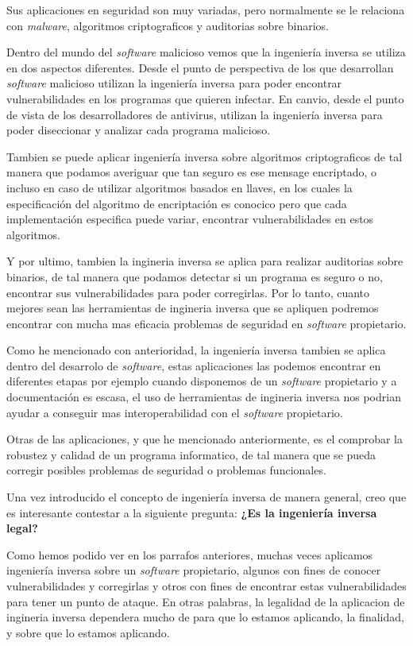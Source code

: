 Sus aplicaciones en seguridad son muy variadas, pero normalmente se le relaciona con \textit{malware}, algoritmos criptograficos y auditorias sobre binarios.

Dentro del mundo del \textit{software} malicioso vemos que la ingeniería inversa se utiliza en dos aspectos diferentes. Desde el punto de perspectiva de los que desarrollan
\textit{software} malicioso utilizan la ingeniería inversa para poder encontrar vulnerabilidades en los programas que quieren infectar. En canvio, desde el punto de vista de los 
desarrolladores de antivirus, utilizan la ingeniería inversa para poder diseccionar y analizar cada programa malicioso.

Tambien se puede aplicar ingeniería inversa sobre algoritmos criptograficos de tal manera que podamos averiguar que tan seguro es ese mensage encriptado, o incluso en caso de utilizar
algoritmos basados en llaves, en los cuales la especificación del algoritmo de encriptación es conocico pero que cada implementación especifica puede variar, encontrar vulnerabilidades
en estos algoritmos.

Y por ultimo, tambien la ingineria inversa se aplica para realizar auditorias sobre binarios, de tal manera que podamos detectar si un programa es seguro o no, encontrar sus vulnerabilidades
para poder corregirlas. Por lo tanto, cuanto mejores sean las herramientas de ingineria inversa que se apliquen podremos encontrar con mucha mas eficacia problemas de seguridad en 
\textit{software} propietario.

Como he mencionado con anterioridad, la ingeniería inversa tambien se aplica dentro del desarrolo de \textit{software}, estas aplicaciones las podemos encontrar en diferentes etapas
por ejemplo cuando disponemos de un \textit{software} propietario y a documentación es escasa, el uso de herramientas de ingineria inversa nos podrian ayudar a conseguir mas interoperabilidad
con el \textit{software} propietario.

Otras de las aplicaciones, y que he mencionado anteriormente, es el comprobar la robustez y calidad de un programa informatico, de tal manera que se pueda corregir posibles problemas
de seguridad o problemas funcionales.

Una vez introducido el concepto de ingeniería inversa de manera general, creo que es interesante contestar a la siguiente pregunta: \textbf{¿Es la ingeniería inversa legal?}

Como hemos podido ver en los parrafos anteriores, muchas veces aplicamos ingeniería inversa sobre un \textit{software} propietario, algunos con fines de conocer vulnerabilidades y corregirlas
y otros con fines de encontrar estas vulnerabilidades para tener un punto de ataque. En otras palabras, la legalidad de la aplicacion de ingineria inversa dependera mucho de para
que lo estamos aplicando, la finalidad, y sobre que lo estamos aplicando.

